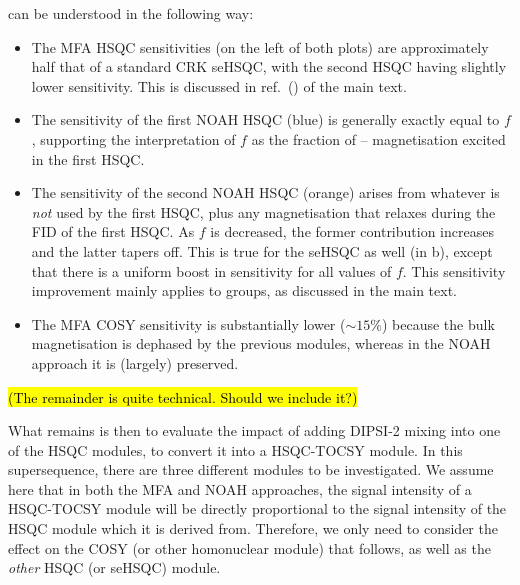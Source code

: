  can be understood in the following way:

\begin{itemize}
    \item The MFA HSQC sensitivities (on the left of both plots) are approximately half that of a standard CRK seHSQC, with the second HSQC having slightly lower sensitivity.
        This is discussed in ref.\ () of the main text.
    \item The sensitivity of the first NOAH HSQC (blue) is generally exactly equal to $f$, supporting the interpretation of $f$ as the fraction of \carbon{}--\proton{} magnetisation excited in the first HSQC.
    \item The sensitivity of the second NOAH HSQC (orange) arises from whatever is \textit{not} used by the first HSQC, plus any magnetisation that relaxes during the FID of the first HSQC.
        As $f$ is decreased, the former contribution increases and the latter tapers off.
        This is true for the seHSQC as well (in b), except that there is a uniform boost in sensitivity for all values of $f$.
        This sensitivity improvement mainly applies to  groups, as discussed in the main text.
    \item The MFA COSY sensitivity is substantially lower ($\sim 15\%$) because the bulk magnetisation is dephased by the previous modules, whereas in the NOAH approach it is (largely) preserved.
\end{itemize}

\hl{(The remainder is quite technical. Should we include it?)}

What remains is then to evaluate the impact of adding DIPSI-2 mixing into one of the HSQC modules, to convert it into a HSQC-TOCSY module.
In this supersequence, there are three different modules to be investigated.
We assume here that in both the MFA and NOAH approaches, the signal intensity of a HSQC-TOCSY module will be directly proportional to the signal intensity of the HSQC module which it is derived from.
Therefore, we only need to consider the effect on the COSY (or other homonuclear module) that follows, as well as the \textit{other} HSQC (or seHSQC) module.


